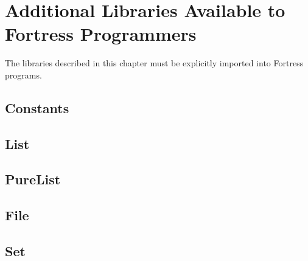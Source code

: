 %
%
%
%

\chapter{Additional Libraries Available to Fortress Programmers}

The libraries described in this chapter must be explicitly imported
into Fortress programs.

\section{Constants}



\section{List}



\section{PureList}



\section{File}



\section{Set}

